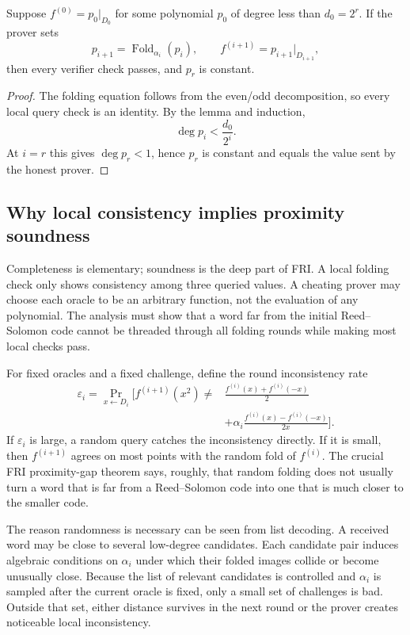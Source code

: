 \begin{theorem}
Suppose $f^{(0)}=p_0|_{D_0}$ for some polynomial $p_0$ of degree less than $d_0=2^r$.
If the prover sets
\[
    p_{i+1}=\operatorname{Fold}_{\alpha_i}(p_i),
    \qquad
    f^{(i+1)}=p_{i+1}|_{D_{i+1}},
\]
then every verifier check passes, and $p_r$ is constant.
\end{theorem}

\begin{proof}
The folding equation follows from the even/odd decomposition, so every local query check is
an identity. By the lemma and induction,
\[
    \deg p_i<\frac{d_0}{2^i}.
\]
At $i=r$ this gives $\deg p_r<1$, hence $p_r$ is constant and equals the value sent by the
honest prover.
\end{proof}

\subsection{Why local consistency implies proximity soundness}

Completeness is elementary; soundness is the deep part of FRI. A local folding check only
shows consistency among three queried values. A cheating prover may choose each oracle to be
an arbitrary function, not the evaluation of any polynomial. The analysis must show that a
word far from the initial Reed--Solomon code cannot be threaded through all folding rounds
while making most local checks pass.

For fixed oracles and a fixed challenge, define the round inconsistency rate
\[
\begin{aligned}
\varepsilon_i
=\Pr_{x\leftarrow D_i}\Biggl[
f^{(i+1)}(x^2)\neq{}&
\frac{f^{(i)}(x)+f^{(i)}(-x)}{2}\\
&+\alpha_i\frac{f^{(i)}(x)-f^{(i)}(-x)}{2x}
\Biggr].
\end{aligned}
\]
If $\varepsilon_i$ is large, a random query catches the inconsistency directly. If it is
small, then $f^{(i+1)}$ agrees on most points with the random fold of $f^{(i)}$. The crucial
FRI proximity-gap theorem says, roughly, that random folding does not usually turn a word
that is far from a Reed--Solomon code into one that is much closer to the smaller code.

The reason randomness is necessary can be seen from list decoding. A received word may be
close to several low-degree candidates. Each candidate pair induces algebraic conditions on
$\alpha_i$ under which their folded images collide or become unusually close. Because the
list of relevant candidates is controlled and $\alpha_i$ is sampled after the current oracle
is fixed, only a small set of challenges is bad. Outside that set, either distance survives in
the next round or the prover creates noticeable local inconsistency.


